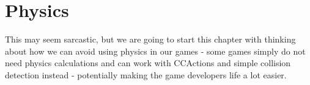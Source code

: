 \chapter{Physics}
This may seem sarcastic, but we are going to start this chapter with thinking
about how we can avoid using physics in our games - some games simply do not
need physics calculations and can work with CCActions and simple collision
detection instead - potentially making the game developers life a lot easier.
